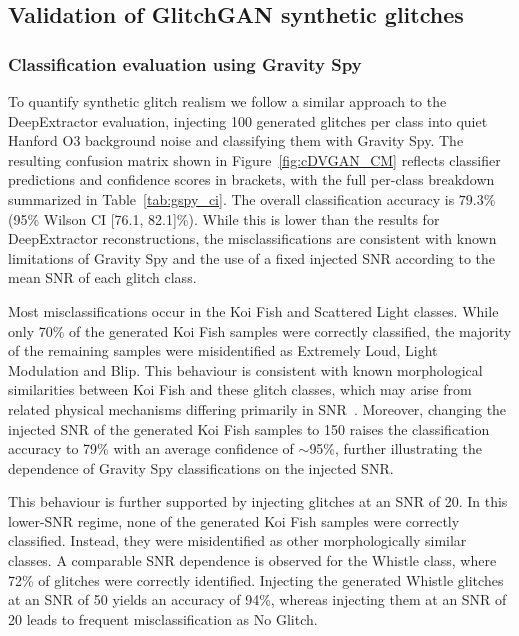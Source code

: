 \documentclass[reprint,nofootinbib,amsmath,amssymb,aps,floatfix]{revtex4-2}
\begin{document}
\subsection{Validation of GlitchGAN synthetic glitches}

\subsubsection{Classification evaluation using Gravity Spy}
\label{sec:GlitchGAN_gspy_eval}
To quantify synthetic glitch realism we follow a similar approach to the DeepExtractor evaluation, injecting 100 generated glitches per class into quiet Hanford O3 background noise and classifying them with Gravity Spy.
The resulting confusion matrix shown in Figure~\ref{fig:cDVGAN_CM} reflects classifier predictions and confidence scores in brackets, with the full per-class breakdown summarized in Table~\ref{tab:gspy_ci}. 
The overall classification accuracy is $79.3\%$ (95\% Wilson CI [76.1, 82.1]\%).
While this is lower than the results for DeepExtractor reconstructions, the misclassifications are consistent with known limitations of Gravity Spy and the use of a fixed injected SNR according to the mean SNR of each glitch class.

Most misclassifications occur in the Koi Fish and Scattered Light classes. 
While only 70\% of the generated Koi Fish samples were correctly classified, the majority of the remaining samples were misidentified as Extremely Loud, Light Modulation and Blip.
This behaviour is consistent with known morphological similarities between Koi Fish and these glitch classes, which may arise from related physical mechanisms differing primarily in SNR~\cite{Areeda2017}.
Moreover, changing the injected SNR of the generated Koi Fish samples to 150 raises the classification accuracy to 79\% with an average confidence of $\sim$95\%, further illustrating the dependence of Gravity Spy classifications on the injected SNR.


This behaviour is further supported by injecting glitches at an SNR of 20.
In this lower-SNR regime, none of the generated Koi Fish samples were correctly classified.
Instead, they were misidentified as other morphologically similar classes.
A comparable SNR dependence is observed for the Whistle class, where 72\% of glitches were correctly identified.
Injecting the generated Whistle glitches at an SNR of 50 yields an accuracy of 94\%, whereas injecting them at an SNR of 20 leads to frequent misclassification as No Glitch.
\end{document}
